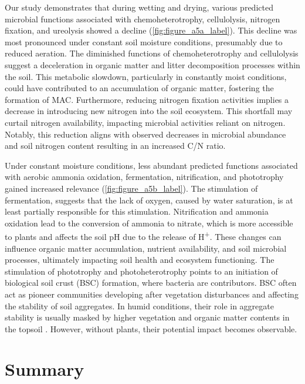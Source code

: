 Our study demonstrates that during wetting and drying, various predicted microbial functions associated with chemoheterotrophy, cellulolysis, nitrogen fixation, and ureolysis showed a decline (\cref{fig:figure_a5a_label}). 
This decline was most pronounced under constant soil moisture conditions, presumably due to reduced aeration. 
The diminished functions of chemoheterotrophy and cellulolysis suggest a deceleration in organic matter and litter decomposition processes within the soil. 
This metabolic slowdown, particularly in constantly moist conditions, could have contributed to an accumulation of organic matter, fostering the formation of MAC. 
Furthermore, reducing nitrogen fixation activities implies a decrease in introducing new nitrogen into the soil ecosystem. 
This shortfall may curtail nitrogen availability, impacting microbial activities reliant on nitrogen. 
Notably, this reduction aligns with observed decreases in microbial abundance and soil nitrogen content resulting in an increased C/N ratio.

Under constant moisture conditions, less abundant predicted functions associated with aerobic ammonia oxidation, fermentation, nitrification, and phototrophy gained increased relevance (\cref{fig:figure_a5b_label}). 
The stimulation of fermentation, suggests that the lack of oxygen, caused by water saturation, is at least partially responsible for this stimulation. 
Nitrification and ammonia oxidation lead to the conversion of ammonia to nitrate, which is more accessible to plants and affects the soil pH due to the release of H\textsuperscript{+}. 
These changes can influence organic matter accumulation, nutrient availability, and soil microbial processes, ultimately impacting soil health and ecosystem functioning. 
The stimulation of phototrophy and photoheterotrophy points to an initiation of biological soil crust (BSC) formation, where bacteria are contributors. 
BSC often act as pioneer communities developing after vegetation disturbances and affecting the stability of soil aggregates. 
In humid conditions, their role in aggregate stability is usually masked by higher vegetation and organic matter contents in the topsoil \citep{RiverasMunoz2022}. 
However, without plants, their potential impact becomes observable.

\section{Summary}

